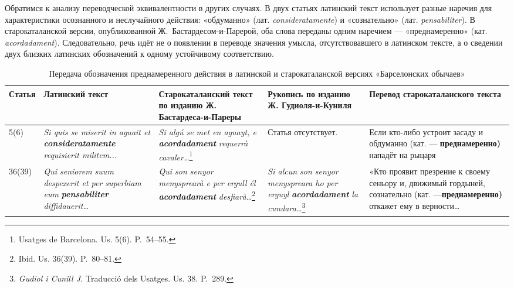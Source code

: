 Обратимся к анализу переводческой эквивалентности в других случаях. В двух статьях латинский текст использует разные наречия для характеристики осознанного и неслучайного действия: «обдуманно» (лат. \emph{consideratamente}) и «сознательно» (лат. \emph{pensabiliter}). В старокаталанской версии, опубликованной Ж.~Бастардесом-и-Парерой, оба слова переданы одним наречием --- «преднамеренно» (кат. \emph{acordadament}). Следовательно, речь идёт не о появлении в переводе значения умысла, отсутствовавшего в латинском тексте, а о сведении двух близких латинских обозначений к одному устойчивому соответствию.

\begin{center}
\small
\setlength{\tabcolsep}{2pt}
\begin{longtable}{|p{}|p{}|p{}|p{}|p{}|}
\caption{Передача обозначения преднамеренного действия в латинской и старокаталанской версиях «Барселонских обычаев»}\label{tab:ch2-intention}\\
\hline
\textbf{Статья} & \textbf{Латинский текст} & \textbf{Старокаталанский текст по изданию Ж. Бастардеса-и-Пареры} & \textbf{Р}\textbf{укопись по изданию Ж. Гудиоля-и-Куниля} & \textbf{Перевод старокаталанского текста} \\ \hline
5(6) & \emph{Si quis se miserit in aguait et }\textbf{\emph{consideratamente}}\emph{ requisierit militem..}\emph{.} & \emph{Si algú se met en aguayt, e }\textbf{\emph{acordadament }}\emph{requerrà cavaler}\emph{…}\footnote{Usatges de Barcelona. Us. 5(6). P.~54--55.} & Статья отсутствует. & Если кто-либо устроит засаду и обдуманно (кат. --- \textbf{преднамеренно}\textbf{)} нападёт на рыцаря \\ \hline
36(39) & \emph{Qui seniorem suum despexerit et per superbiam eum }\textbf{\emph{pensabiliter }}\emph{diffidauerit}\emph{…} & \emph{Qui son senyor menysprearà e per ergull él }\textbf{\emph{acordadament}}\emph{ desfiarà}\emph{…}\footnote{Ibid. Us. 36(39). P.~80--81.} & \emph{Si alcun son senyor menyspreara ho per erguyl }\textbf{\emph{acordadament}}\emph{ la cundara}\emph{…}\footnote{\emph{Gudiol i Cunill J. }Traducció dels Usatges. Us. 38.\textbf{ }P.~289.} & «Кто проявит презрение к своему сеньору и, движимый гордыней, сознательно (кат. ---\textbf{преднамеренно}\textbf{)} откажет ему в верности… \\ \hline
\end{longtable}
\end{center}

